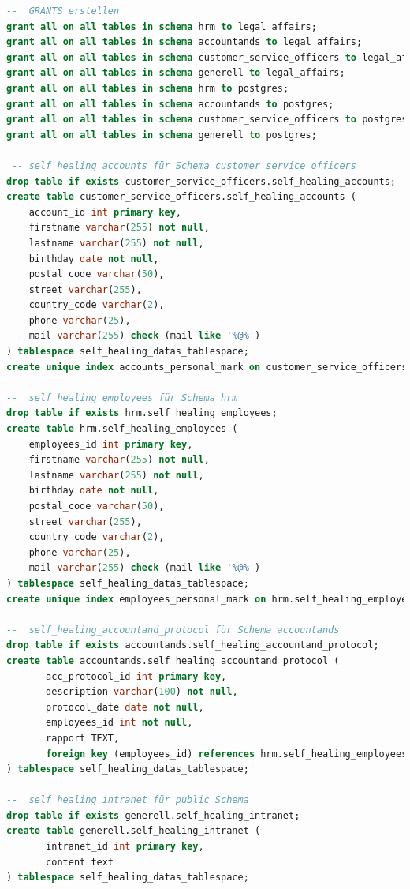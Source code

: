 \begin{lstlisting}[language=sql, caption=Patroni - Self Healing Tests - CREATE-SQL,captionpos=b,label={lst:patroni-self-healing-create-sql},breaklines=true]
--  GRANTS erstellen
grant all on all tables in schema hrm to legal_affairs;
grant all on all tables in schema accountands to legal_affairs;
grant all on all tables in schema customer_service_officers to legal_affairs;
grant all on all tables in schema generell to legal_affairs;
grant all on all tables in schema hrm to postgres;
grant all on all tables in schema accountands to postgres;
grant all on all tables in schema customer_service_officers to postgres;
grant all on all tables in schema generell to postgres;

 -- self_healing_accounts für Schema customer_service_officers
drop table if exists customer_service_officers.self_healing_accounts;
create table customer_service_officers.self_healing_accounts (
    account_id int primary key,
    firstname varchar(255) not null,
    lastname varchar(255) not null,
    birthday date not null,
    postal_code varchar(50),
    street varchar(255),
    country_code varchar(2),
    phone varchar(25),
    mail varchar(255) check (mail like '%@%')
) tablespace self_healing_datas_tablespace;
create unique index accounts_personal_mark on customer_service_officers.self_healing_accounts(firstname, lastname, birthday) tablespace self_healing_indices_tablespace;

--  self_healing_employees für Schema hrm
drop table if exists hrm.self_healing_employees;
create table hrm.self_healing_employees (
    employees_id int primary key,
    firstname varchar(255) not null,
    lastname varchar(255) not null,
    birthday date not null,
    postal_code varchar(50),
    street varchar(255),
    country_code varchar(2),
    phone varchar(25),
    mail varchar(255) check (mail like '%@%')
) tablespace self_healing_datas_tablespace;
create unique index employees_personal_mark on hrm.self_healing_employees(firstname, lastname, birthday) tablespace self_healing_indices_tablespace;

--  self_healing_accountand_protocol für Schema accountands
drop table if exists accountands.self_healing_accountand_protocol;
create table accountands.self_healing_accountand_protocol (
       acc_protocol_id int primary key,
       description varchar(100) not null,
       protocol_date date not null,
       employees_id int not null,
       rapport TEXT,
       foreign key (employees_id) references hrm.self_healing_employees(employees_id) on update restrict on delete restrict
) tablespace self_healing_datas_tablespace;

--  self_healing_intranet für public Schema
drop table if exists generell.self_healing_intranet;
create table generell.self_healing_intranet (
       intranet_id int primary key,
       content text
) tablespace self_healing_datas_tablespace;


\end{lstlisting}
